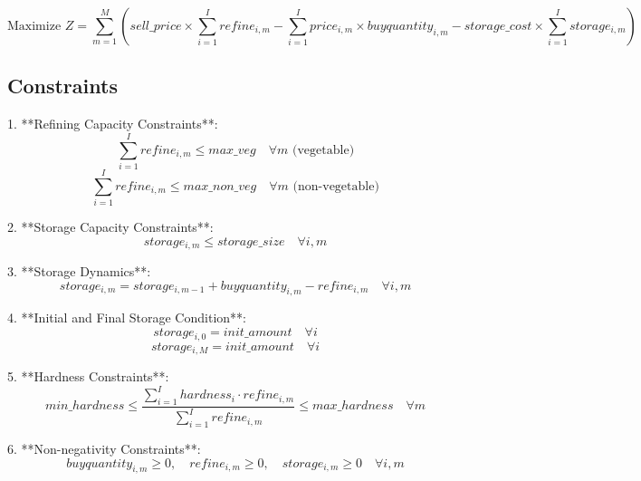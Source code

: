 \documentclass{article}
\begin{document}
\[
\text{Maximize } Z = \sum_{m=1}^{M} \left( sell\_price \times \sum_{i=1}^{I} refine_{i,m} - \sum_{i=1}^{I} price_{i,m} \times buyquantity_{i,m} - storage\_cost \times \sum_{i=1}^{I} storage_{i,m} \right)
\]

\subsection*{Constraints}
1. **Refining Capacity Constraints**:
\[
\sum_{i=1}^{I} refine_{i,m} \leq max\_veg \quad \forall m \text{ (vegetable)}
\]
\[
\sum_{i=1}^{I} refine_{i,m} \leq max\_non\_veg \quad \forall m \text{ (non-vegetable)}
\]

2. **Storage Capacity Constraints**:
\[
storage_{i,m} \leq storage\_size \quad \forall i, m
\]

3. **Storage Dynamics**:
\[
storage_{i,m} = storage_{i,m-1} + buyquantity_{i,m} - refine_{i,m} \quad \forall i, m
\]

4. **Initial and Final Storage Condition**:
\[
storage_{i,0} = init\_amount \quad \forall i
\]
\[
storage_{i,M} = init\_amount \quad \forall i
\]

5. **Hardness Constraints**:
\[
min\_hardness \leq \frac{\sum_{i=1}^{I} hardness_{i} \cdot refine_{i,m}}{\sum_{i=1}^{I} refine_{i,m}} \leq max\_hardness \quad \forall m
\]

6. **Non-negativity Constraints**:
\[
buyquantity_{i,m} \geq 0, \quad refine_{i,m} \geq 0, \quad storage_{i,m} \geq 0 \quad \forall i, m
\]
\end{document}
